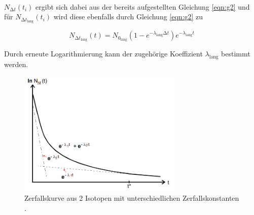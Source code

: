 \\
\begin{flushleft}
$N_{\increment t}(t_{i})$ ergibt sich dabei aus der bereits aufgestellten Gleichung \eqref{eqn:g2} und für $N_{{\increment t}_{\text{lang}}}(t_{i})$ wird diese ebenfalls durch Gleichung \eqref{eqn:g2} zu
\end{flushleft}
\begin{equation}
N_{\increment t_{\text{lang}}}(t) = N_{{0}_{\text{lang}}} (1-e^{-{\lambda}_{\text{lang}} \increment t}) e^{-{\lambda}_{\text{lang}} t}
\end{equation}
\begin{flushleft}
Durch erneute Logarithmierung kann der zugehörige Koeffizient $\lambda_{\text{lang}}$ bestimmt werden. 
\end{flushleft}
\begin{figure}
  \centering
  \includegraphics[width=0.7\textwidth]{bilder/AbbildungKurve.png}
  \caption{Zerfallskurve aus 2 Isotopen mit unterschiedlichen Zerfallskonstanten \cite{skript}.}
  \label{fig:AbbildungKurve}
\end{figure}
